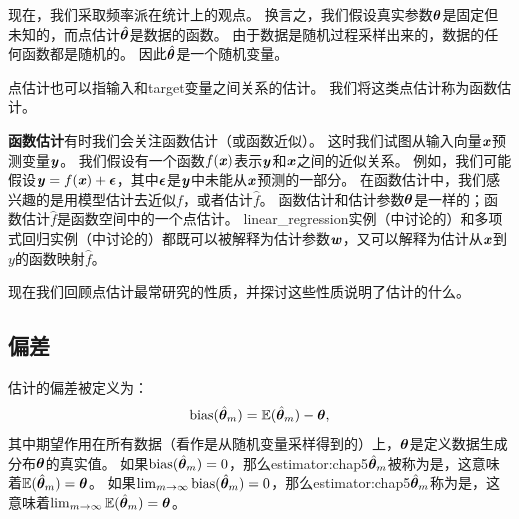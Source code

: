 
现在，我们采取频率派在统计上的观点。
换言之，我们假设真实参数$\boldsymbol{\theta}$是固定但未知的，而点估计$\hat{\boldsymbol{\theta}}$是数据的函数。
由于数据是随机过程采样出来的，数据的任何函数都是随机的。
因此$\hat{\boldsymbol{\theta}}$是一个随机变量。


点估计也可以指输入和\gls{target}变量之间关系的估计。
我们将这类点估计称为函数估计。

\textbf{函数估计}\quad 有时我们会关注函数估计（或函数近似）。
这时我们试图从输入向量$\boldsymbol{\mathit{x}}$预测变量$\boldsymbol{\mathit{y}}$。
我们假设有一个函数$f(\boldsymbol{\mathit{x}})$表示$\boldsymbol{\mathit{y}}$和$\boldsymbol{\mathit{x}}$之间的近似关系。
例如，我们可能假设$\boldsymbol{\mathit{y}} = f(\boldsymbol{\mathit{x}}) + \boldsymbol{\epsilon}$，其中$\boldsymbol{\epsilon}$是$\boldsymbol{\mathit{y}}$中未能从$\boldsymbol{\mathit{x}}$预测的一部分。
在函数估计中，我们感兴趣的是用模型估计去近似$f$，或者估计$\hat{f}$。
函数估计和估计参数$\boldsymbol{\theta}$是一样的；函数估计$\hat{f}$是函数空间中的一个点估计。
\gls{linear_regression}实例（中讨论的）和多项式回归实例（中讨论的）都既可以被解释为估计参数$\boldsymbol{\mathit{w}}$，又可以解释为估计从$\boldsymbol{\mathit{x}}$到$y$的函数映射$\hat{f}$。

现在我们回顾点估计最常研究的性质，并探讨这些性质说明了估计的什么。

\subsection{偏差}
\label{sec:bias}
估计的偏差被定义为：
\begin{equation}
\label{eq:5.20}
    \text{bias}(\hat{\boldsymbol{\theta}}_m) = \mathbb{E}(\hat{\boldsymbol{\theta}}_m) - \boldsymbol{\theta},
\end{equation}
其中期望作用在所有数据（看作是从随机变量采样得到的）上，$\boldsymbol{\theta}$是定义数据生成分布$\boldsymbol{\theta}$的真实值。
如果$\text{bias}(\hat{\boldsymbol{\theta}}_m)=0$，那么\gls{estimator:chap5}$\hat{\boldsymbol{\theta}}_m$被称为是，这意味着$\mathbb{E}(\hat{\boldsymbol{\theta}}_m) = \boldsymbol{\theta}$。
如果$\lim_{m\to\infty} \text{bias}(\hat{\boldsymbol{\theta}}_m)=0$，那么\gls{estimator:chap5}$\hat{\boldsymbol{\theta}}_m$称为是，这意味着$\lim_{m\to\infty} \mathbb{E}(\hat{\boldsymbol{\theta}}_m) = \boldsymbol{\theta}$。


